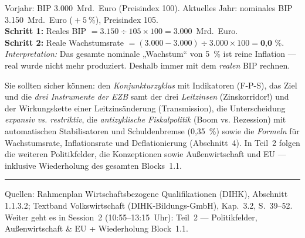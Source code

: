\documentclass[11pt, a4paper]{article}
\begin{document}
\begin{beispiel}
Vorjahr: BIP 3.000~Mrd.~Euro (Preisindex 100). Aktuelles Jahr: nominales BIP
3.150~Mrd.~Euro (${}+5~\%$), Preisindex 105.\\[0.3em]
\textbf{Schritt 1:} Reales BIP $= 3.150 \div 105 \times 100 = 3.000$~Mrd.~Euro.\\
\textbf{Schritt 2:} Reale Wachstumsrate $= (3.000 - 3.000) \div 3.000 \times 100
= \textbf{0{,}0~\%}$.\\[0.3em]
\emph{Interpretation:} Das gesamte nominale „Wachstum`` von 5~\% ist reine Inflation ---
real wurde nicht mehr produziert. Deshalb immer mit dem \emph{realen} BIP rechnen.
\end{beispiel}

\begin{merksatz}[title={\bfseries Wichtig für die Prüfungsvorbereitung (Teil 1)}]
Sie sollten sicher können: den \emph{Konjunkturzyklus} mit Indikatoren (F-P-S), das Ziel
und die \emph{drei Instrumente der EZB} samt der drei \emph{Leitzinsen} (Zinskorridor!)
und der Wirkungskette einer Leitzinsänderung (Transmission), die Unterscheidung
\emph{expansiv vs. restriktiv}, die \emph{antizyklische Fiskalpolitik} (Boom vs.
Rezession) mit automatischen Stabilisatoren und Schuldenbremse (0,35~\%) sowie die
\emph{Formeln} für Wachstumsrate, Inflationsrate und Deflationierung (Abschnitt~4). In Teil~2
folgen die weiteren Politikfelder, die Konzeptionen sowie Außenwirtschaft und EU ---
inklusive Wiederholung des gesamten Blocks~1.1.
\end{merksatz}

\vspace{1em}
\hrule
\vspace{0.8em}
\noindent\textsf{\small Quellen: Rahmenplan Wirtschaftsbezogene Qualifikationen (DIHK), Abschnitt 1.1.3.2;
Textband Volkswirtschaft (DIHK-Bildungs-GmbH), Kap.~3.2, S.~39--52. Weiter geht es in Session~2 (10:55--13:15~Uhr):
Teil~2 --- Politikfelder, Außenwirtschaft \& EU + Wiederholung Block~1.1.}
\end{document}
